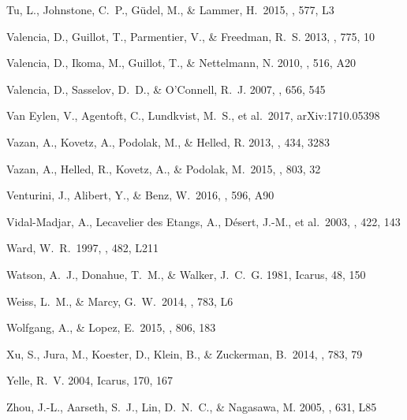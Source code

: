 \documentclass[]{emulateapj}
\begin{document}
\begin{thebibliography}{}
 Tu, L., Johnstone, C.~P., G{\"u}del, M., \& Lammer, H.\ 2015, \aap, 577, L3 

{Valencia}, D., {Guillot}, T., {Parmentier}, V., \& {Freedman}, R.~S. 2013,
  \apj, 775, 10

{Valencia}, D., {Ikoma}, M., {Guillot}, T., \& {Nettelmann}, N. 2010, \aap,
  516, A20

{Valencia}, D., {Sasselov}, D.~D., \& {O'Connell}, R.~J. 2007, \apj, 656, 545

  Van Eylen, V., Agentoft, C., Lundkvist, M.~S., et al.\ 2017, arXiv:1710.05398 

{Vazan}, A., {Kovetz}, A., {Podolak}, M., \& {Helled}, R. 2013, \mnras, 434,
  3283
  
   Vazan, A., Helled, R., Kovetz, A., \& Podolak, M.\ 2015, \apj, 803, 32 
  
  Venturini, J., Alibert, Y., \& Benz, W.\ 2016, \aap, 596, A90 
 
   Vidal-Madjar, A., Lecavelier des Etangs, A., D{\'e}sert, J.-M., et al.\ 2003, \nat, 422, 143 

 Ward, W.~R.\ 1997, \apjl, 482, L211 

{Watson}, A.~J., {Donahue}, T.~M., \& {Walker}, J.~C.~G. 1981, Icarus, 48, 150

 Weiss, L.~M., \& Marcy, G.~W.\ 2014, \apjl, 783, L6 

 Wolfgang, A., \& Lopez, E.\ 2015, \apj, 806, 183 

 Xu, S., Jura, M., Koester, D., Klein, B., \& Zuckerman, B.\ 2014, \apj, 783, 79 

{Yelle}, R.~V. 2004, Icarus, 170, 167

{Zhou}, J.-L., {Aarseth}, S.~J., {Lin}, D.~N.~C., \& {Nagasawa}, M. 2005,
  \apjl, 631, L85

\end{thebibliography}
\end{document}
